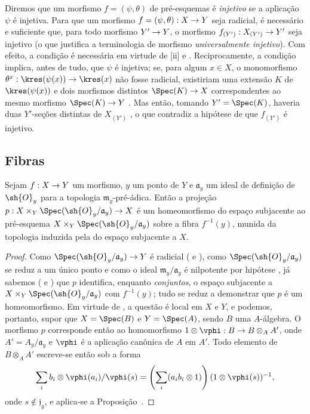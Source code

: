 \documentclass[oneside]{amsart}
\makeatletter
\newcommand{\ega@arrow}[2]{\mathchoice{#1}{#2}{#2}{#2}}
\renewcommand{\to}{\ega@arrow{\longrightarrow}{\rightarrow}}
\let\EGAOriginalLabel\label
\renewcommand{\label}[1]{\phantomsection\EGAOriginalLabel{#1}}
\makeatother
\begin{document}
\begin{remark}[3.5.11]
\label{I.3.5.11}
Diremos que um morfismo $f=(\psi,\theta)$ de pré-esquemas é
\emph{injetivo} se a aplicação $\psi$ é injetiva.
Para que um morfismo $f=(\psi,\theta):X\to Y$ seja radicial, é necessário
e suficiente que, para todo morfismo $Y'\to Y$, o morfismo
$f_{(Y')}:X_{(Y')}\to Y'$ seja injetivo (o que justifica a terminologia de
morfismo \emph{universalmente injetivo}).
Com efeito, a condição é necessária em virtude de
[ii] e .
Reciprocamente, a condição implica, antes de tudo, que $\psi$ é injetiva;
se, para algum $x\in X$, o monomorfismo
$\theta^x:\kres(\psi(x))\to\kres(x)$ não fosse radicial, existiriam uma
extensão $K$ de $\kres(\psi(x))$ e dois morfismos distintos
$\Spec(K)\to X$ correspondentes ao mesmo morfismo $\Spec(K)\to Y$
.
Mas então, tomando $Y'=\Spec(K)$, haveria duas $Y'$-seções distintas de
$X_{(Y')}$ , o que contradiz a hipótese de que
$f_{(Y')}$ é injetivo.
\end{remark}

\subsection{Fibras}
\label{subsection:I.3.6}

\begin{proposition}[3.6.1]
\label{I.3.6.1}
Sejam $f:X\to Y$ um morfismo, $y$ um ponto de $Y$ e $\mathfrak{a}_y$ um ideal de definição de $\sh{O}_y$ para a topologia $\mathfrak{m}_y$-pré-ádica.
Então a projeção $p:X\times_Y\Spec(\sh{O}_y/\mathfrak{a}_y)\to X$ é um homeomorfismo do espaço subjacente ao pré-esquema $X\times_Y\Spec(\sh{O}_y/\mathfrak{a}_y)$ sobre a fibra $f^{-1}(y)$, munida da topologia induzida pela do espaço subjacente a $X$.
\end{proposition}

\begin{proof}
Como $\Spec(\sh{O}_y/\mathfrak{a}_y)\to Y$ é radicial ( e ), como $\Spec(\sh{O}_y/\mathfrak{a}_y)$ se reduz a um único ponto e como o ideal $\mathfrak{m}_y/\mathfrak{a}_y$ é nilpotente por hipótese , já sabemos ( e ) que $p$ identifica, enquanto \emph{conjuntos}, o espaço subjacente a $X\times_Y\Spec(\sh{O}_y/\mathfrak{a}_y)$ com $f^{-1}(y)$; tudo se reduz a demonstrar que $p$ é um homeomorfismo.
Em virtude de , a questão é local em $X$ e $Y$, e podemos, portanto, supor que $X=\Spec(B)$ e $Y=\Spec(A)$, sendo $B$ uma $A$-álgebra.
O morfismo $p$ corresponde então ao homomorfismo $1\otimes\vphi:B\to B\otimes_A A'$, onde $A'=A_y/\mathfrak{a}_y$ e $\vphi$ é a aplicação canônica de $A$ em $A'$.
Todo elemento de $B\otimes_A A'$ escreve-se então sob a forma
\[
  \sum_i b_i\otimes\vphi(a_i)/\vphi(s)=\left(\sum_i(a_ib_i\otimes1)\right)(1\otimes\vphi(s))^{-1},
\]
onde $s\not\in\mathfrak{j}_y$, e aplica-se a Proposição~.
\end{proof}
\end{document}
